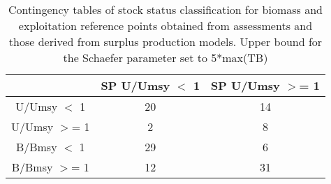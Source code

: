 \begin{table}[ht]
\begin{center}
\begin{tabular}{ccc}
  \hline
 & SP U/Umsy $<$ 1 & SP U/Umsy $>$= 1 \\ 
  \hline
U/Umsy $<$ 1 &  20 &  14 \\ 
  U/Umsy $>$= 1 &   2 &   8 \\ 
  B/Bmsy $<$ 1 &  29 &   6 \\ 
  B/Bmsy $>$= 1 &  12 &  31 \\ 
   \hline
\end{tabular}
\caption{Contingency tables of stock status classification for biomass and exploitation reference points obtained from assessments and those derived from surplus production models. Upper bound for the Schaefer parameter set to 5*max(TB)}
\label{tab:contingency}
\end{center}
\end{table}
